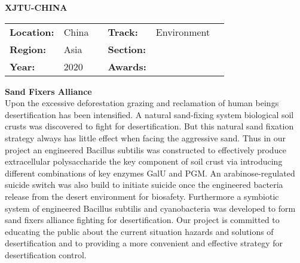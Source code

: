 \textbf{\uppercase{XJTU-China}} \FloatBarrier \begin{table}[h] \begin{tabular}{lp{2.5cm}llll} \textbf{Location:} & China & \multicolumn{1}{|l}{} & \textbf{Track:}   & Environment \\ \textbf{Region:}   & Asia   & \multicolumn{1}{|l}{} & \textbf{Section:} &  \\ \textbf{Year:}     & 2020   & \multicolumn{1}{|l}{} & \textbf{Awards:}  & \end{tabular} \end{table} \FloatBarrier \noindent\textbf{Sand Fixers Alliance} \vspace{.2cm}\\   Upon the excessive deforestation grazing and reclamation of human beings desertification has been intensified. A natural sand-fixing system biological soil crusts was discovered to fight for desertification. But this natural sand fixation strategy always has little effect when facing the aggressive sand. Thus in our project an engineered Bacillus subtilis was constructed to effectively produce extracellular polysaccharide the key component of soil crust via introducing different combinations of key enzymes GalU and PGM. An arabinose-regulated suicide switch was also build to initiate suicide once the engineered bacteria release from the desert environment for biosafety. Furthermore a symbiotic system of engineered Bacillus subtilis and cyanobacteria was developed to form sand fixers alliance fighting for desertification. Our project is committed to educating the public about the current situation hazards and solutions of desertification and to providing a more convenient and effective strategy for desertification control.
\pagebreak
